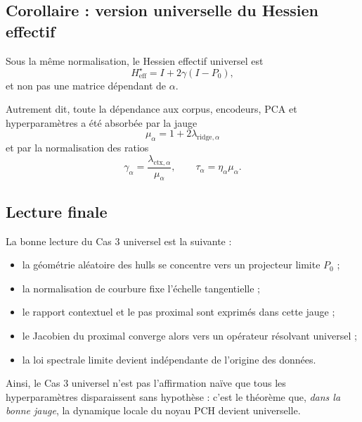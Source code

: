 \subsection{Corollaire : version universelle du Hessien effectif}

Sous la même normalisation, le Hessien effectif universel est
\[
H_{\mathrm{eff}}^\star = I+2\gamma(I-P_0),
\]
et non pas une matrice dépendant de \(\alpha\).

Autrement dit, toute la dépendance aux corpus, encodeurs, PCA et hyperparamètres a été absorbée par la jauge
\[
\mu_\alpha=1+2\lambda_{\mathrm{ridge},\alpha}
\]
et par la normalisation des ratios
\[
\gamma_\alpha=\frac{\lambda_{\mathrm{ctx},\alpha}}{\mu_\alpha},
\qquad
\tau_\alpha=\eta_\alpha\mu_\alpha.
\]

\subsection{Lecture finale}

La bonne lecture du Cas 3 universel est la suivante :

\begin{itemize}
    \item la géométrie aléatoire des hulls se concentre vers un projecteur limite \(P_0\) ;
    \item la normalisation de courbure fixe l'échelle tangentielle ;
    \item le rapport contextuel et le pas proximal sont exprimés dans cette jauge ;
    \item le Jacobien du proximal converge alors vers un opérateur résolvant universel ;
    \item la loi spectrale limite devient indépendante de l'origine des données.
\end{itemize}

Ainsi, le Cas 3 universel n'est pas l'affirmation naïve que tous les hyperparamètres disparaissent sans hypothèse : c'est le théorème que, \emph{dans la bonne jauge}, la dynamique locale du noyau PCH devient universelle.







